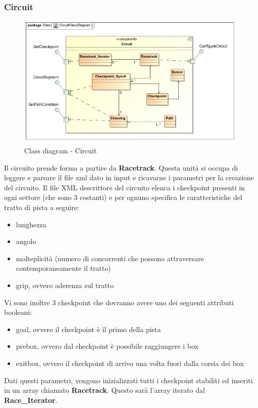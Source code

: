 \subsubsection{Circuit}
\begin{center}
\begin{figure}[h!]
	\includegraphics[scale=0.50]{img/ClassDiagrams/CircuitClassDiagram.jpg}
\caption{Class diagram - Circuit}
\end{figure}
\end{center}
Il circuito prende forma a partire da \textbf{Racetrack}. Questa unit\`{a} si occupa di leggere e parsare il file xml dato in input e ricavarne
i parametri per la creazione del circuito. Il file XML descrittore del circuito elenca i checkpoint presenti in ogni settore (che sono
3 costanti) e per ognuno specifica le caratteristiche del tratto di pista a seguire:
\begin{itemize}
  \item lunghezza
  \item angolo
  \item molteplicit\`{a} (numero di concorrenti che possono attraversare contemporaneamente il tratto)
  \item grip, ovvero aderenza sul tratto
\end{itemize}
Vi sono inoltre 3 checkpoint che dovranno avere uno dei seguenti attributi booleani:
\begin{itemize}
\item goal, ovvero il checkpoint \`{e} il primo della pista
\item prebox, ovvero dal checkpoint \`{e} possibile raggiungere i box
\item exitbox, ovvero il checkpoint di arrivo una volta fuori dalla corsia dei box
\end{itemize}
Dati questi parametri, vengono inizializzati tutti i checkpoint stabiliti ed inseriti in un array chiamato \textbf{Racetrack}. Questo
sar\`{a} l'array iterato dal \textbf{Race\_Iterator}.\\

